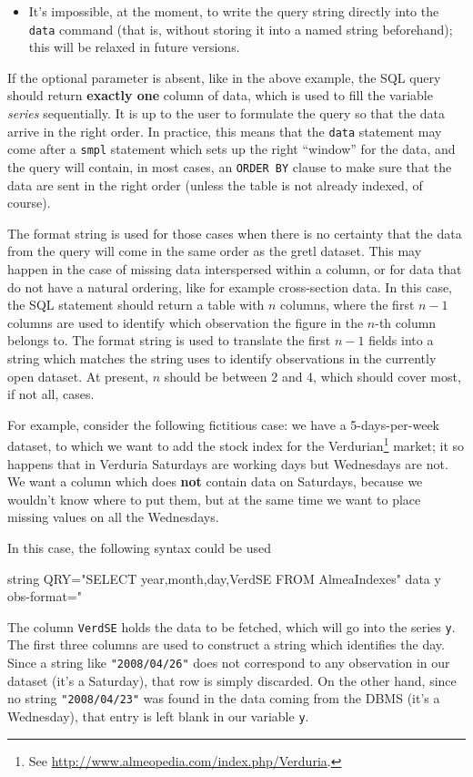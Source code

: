 \begin{itemize}
  \item It's impossible, at the moment, to write the query string
    directly into the \texttt{data} command (that is, without storing
    it into a named string beforehand); this will be relaxed in future
    versions.
\end{itemize}

If the optional parameter is absent, like in the above example, the
SQL query should return \textbf{exactly one} column of data, which is
used to fill the variable \emph{series} sequentially. It is up to the
user to formulate the query so that the data arrive in the right
order. In practice, this means that the \texttt{data} statement may
come after a \texttt{smpl} statement which sets up the right
``window'' for the data, and the query will contain, in most cases, an
\texttt{ORDER BY} clause to make sure that the data are sent in the
right order (unless the table is not already indexed, of course).

The format string is used for those cases when there is no certainty
that the data from the query will come in the same order as the gretl
dataset. This may happen in the case of missing data interspersed
within a column, or for data that do not have a natural ordering, like
for example cross-section data. In this case, the SQL statement should
return a table with $n$ columns, where the first $n-1$ columns are
used to identify which observation the figure in the $n$-th column
belongs to. The format string is used to translate the first $n-1$
fields into a string which matches the string  uses to
identify observations in the currently open dataset. At present, $n$
should be between 2 and 4, which should cover most, if not all, cases.

For example, consider the following fictitious case: we have a
5-days-per-week dataset, to which we want to add the stock index for
the Verdurian\footnote{See
  \url{http://www.almeopedia.com/index.php/Verduria}.} market; it so
happens that in Verduria Saturdays are working days but Wednesdays are
not. We want a column which does \textbf{not} contain data on
Saturdays, because we wouldn't know where to put them, but at the same
time we want to place missing values on all the Wednesdays.

In this case, the following syntax could be used
%
\begin{code}
  string QRY="SELECT year,month,day,VerdSE FROM AlmeaIndexes"
  data y obs-format="%
\end{code}
%
The column \texttt{VerdSE} holds the data to be fetched, which will go
into the  series \texttt{y}. The first three columns are
used to construct a string which identifies the day. Since a string
like \texttt{"2008/04/26"} does not correspond to any observation in
our dataset (it's a Saturday), that row is simply discarded. On the
other hand, since no string \texttt{"2008/04/23"} was found in the
data coming from the DBMS (it's a Wednesday), that entry is left blank
in our variable \texttt{y}.

